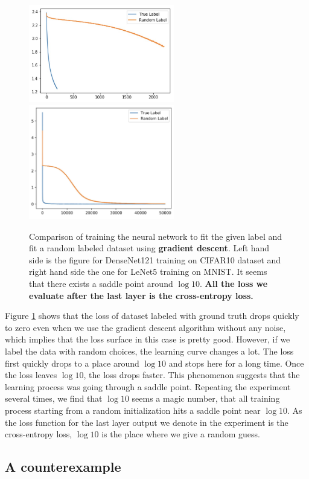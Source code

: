 \documentclass{article}
\theoremstyle{plain}
\theoremstyle{definition}
\begin{document}
\begin{figure}[htp]
	\centering
	\includegraphics[width=2.5in]{cifar.jpeg}
	\includegraphics[width=2.5in]{mnist.jpg}
	\caption{Comparison of training the neural network to fit the given label and fit a random labeled dataset using \textbf{gradient descent}. Left hand side is the figure for DenseNet121 training on CIFAR10 dataset and right hand side the one for LeNet5 training on MNIST. It seems that there exists a saddle point around $\log 10$. \textbf{All the loss we evaluate after the last layer is the cross-entropy loss.}}
	\label{saas}
\end{figure}

Figure \ref{saas} shows that the loss of dataset labeled with ground truth drops quickly to zero even when we use the gradient descent algorithm without any noise, which implies that the loss surface in this case is pretty good. However, if we label the data with random choices, the learning curve changes a lot. The loss first quickly drops to a place around $\log 10$ and stops here for a long time. Once the loss leaves $\log 10$, the loss drops faster. This phenomenon suggests that the learning process was going through a saddle point. Repeating the experiment several times, we find that $\log10$ seems a magic number, that all training process starting from a random initialization hits a saddle point near $\log 10$. As the loss function for the last layer output we denote in the experiment is the cross-entropy loss, $\log 10$ is the place where we give a random guess.


\subsection{A counterexample}
\end{document}
